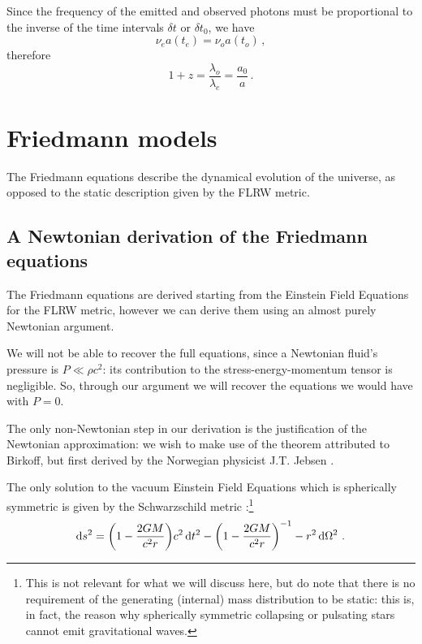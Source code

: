 \documentclass[main.tex]{subfiles}
\begin{document}
Since the frequency of the emitted and observed photons must be proportional to the inverse of the time intervals \(\delta t\) or \(\delta t_0 \), we have
\begin{equation}
  \nu_{e} a(t_{e}) = \nu_{o} a(t_{o})\,,
\end{equation}
%
therefore 
%
\begin{equation}
  1 + z = \frac{\lambda_{o}}{\lambda_{e}}
  = \frac{a_0 }{a}\,.
\end{equation}

\chapter{Friedmann models}

The Friedmann equations describe the dynamical evolution of the universe, as opposed to the static description given by the FLRW metric.

\section{A Newtonian derivation of the Friedmann equations}

The Friedmann equations are derived starting from the Einstein Field Equations for the FLRW metric, however we can derive them using an almost purely Newtonian argument.

We will not be able to recover the full equations, since a Newtonian fluid's pressure is \(P \ll \rho c^2\): its contribution to the stress-energy-momentum tensor is negligible.
So, through our argument we will recover the equations we would have with \(P=0\).

The only non-Newtonian step in our derivation is the justification of the Newtonian approximation: we wish to make use of the theorem attributed to Birkoff, but first derived by the Norwegian physicist J.T. Jebsen \cite[]{johansenDiscoveryBirkhoffTheorem2005}.

\begin{proposition}
The only solution to the vacuum Einstein Field Equations which is spherically symmetric is given by the Schwarzschild metric \cite[sec. 32.2]{misnerGravitation1973}:\footnote{This is not relevant for what we will discuss here, but do note that there is no requirement of the generating (internal) mass distribution to be static: this is, in fact, the reason why spherically symmetric collapsing or pulsating stars cannot emit  gravitational waves.}
%
\begin{align}
\dd{s^2} =  \qty(1 - \frac{2GM}{c^2r}) c^2 \dd{t^2} 
- \qty(1 - \frac{2GM}{c^2r})^{-1} - r^2 \dd{\Omega^2}
\,.
\end{align}
\end{proposition}
\end{document}
